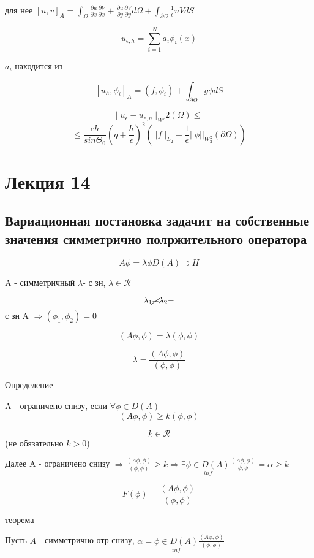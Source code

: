 \documentclass[12pt, a4paper]{article}
\begin{document}
для нее $ [u, v]_A = \int_{\Omega}^{} \frac{\partial u}{\partial x} \frac{\partial V}{\partial x} + \frac{\partial u}{\partial y} \frac{\partial V}{\partial y} d\Omega + \int_{\partial \Omega}^{} \frac{1}{\epsilon} u V dS $

\[ u_{\epsilon, h} = \sum_{i=1}^{N} a_i \phi_i(x) \]

$ a_i $ находится из

\[ [u_h, \phi_i]_A = (f, \phi_i) + \int_{\partial \Omega}^{}g \phi dS \]

\[ ||u_\epsilon - u_{\epsilon, n} ||_{W'} 2 (\Omega) \leq \]
\[ \leq \frac{ch}{sin \Theta_0} {(q + \frac{h}{\epsilon})}^2 ({||f||}_{L_2} + \frac{1 }{\epsilon} ||\phi||_{W_2^2} (\partial \Omega )) \]

\section{Лекция 14}

\subsection{Вариационная постановка задачит на собственные значения симметрично полржительного оператора}

\[ A \phi = \lambda \phi D(A) \supset H \label{eq:14_1}\]

A - симметричный $ \lambda  $- с зн, $ \lambda \in \mathcal{R} $

\[ \lambda_1 \cancel{=} \lambda_2 - \] с зн A $ \Rightarrow (\phi_1, \phi_2) = 0$

\[ (A\phi, \phi) = \lambda (\phi, \phi) \]

\[ \lambda = \frac{(A\phi, \phi)}{(\phi, \phi)} \label{eq:14_2} \]

Определение

A - ограничено снизу, если $ \forall \phi \in D(A) $
\[ (A\phi, \phi) \geq k(\phi, \phi)  \label{eq:14_3}\]

\[ k\in \mathcal{R}  \] (не обязательно $ k>0 $)

Далее A - ограничено снизу $ \Rightarrow  \frac{(A \phi, \phi)}{(\phi, \phi)} \geq k \Rightarrow \exists \underset{inf}{\phi \in D(A)} \frac{(A\phi, \phi)}{\phi, \phi} = \alpha \geq k$

\[ F(\phi) = \frac{(A \phi, \phi)}{(\phi, \phi)} \label{eq:14_4} \]

теорема

Пусть $ A $ - симметрично отр снизу, $ \alpha = \underset{inf}{\phi \in D(A)} \frac{(A \phi, \phi)}{(\phi, \phi)} $
\end{document}
